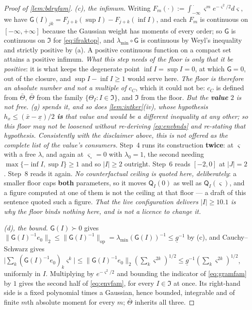 \begin{proof}[Proof of \cref{lem:bdryfam}]
\emph{(c), the infimum.} Writing $F_m(\cdot):=\int_{-\infty}^{\,\cdot}\varsigma^{m}e^{-\varsigma^{2}/2}
d\varsigma$, we have $\mathsf G(I)_{jk}=F_{j+k}(\sup I)-F_{j+k}(\inf I)$, and each $F_m$ is continuous
on $[-\infty,+\infty]$ because the Gaussian weight has moments of every order; so $\mathsf G$ is
continuous on $\mathfrak I$ for \eqref{eq:ifraktop}, and $\lambda_{\min}\circ\mathsf G$ is continuous by
Weyl's inequality and strictly positive by (a). A positive continuous function on a compact set attains
a positive infimum. \emph{What this step needs of the floor is only that it be positive}: it is what keeps the
degenerate point $\inf I=\sup I=0$, at which $\mathsf G=0$, out of the closure, and $\sup I-\inf I\ge1$
would serve here. \emph{The floor is therefore an absolute number and not a multiple of $c_C$}, which it
could not be: $c_C$ is defined from $\bar\Theta$, $\bar\Theta$ from the family
$\{\Theta_I:I\in\mathfrak I\}$, and $\mathfrak I$ from the floor.
\emph{But the \textbf{value} $2$ is not free. \textup{(g)} spends it, and so does
\cref{lem:intker}\textup{(iv)}, whose hypothesis $h_x\le(\bar x-\underline x)/2$ \textbf{is} that
value and would be a different inequality at any other; so this floor may not be loosened without
re-deriving \eqref{eq:envbnds} and re-stating that hypothesis. Consistently with the disclaimer
above, this is not offered as the complete list of the value's consumers.} Step~4 runs its construction \textbf{twice}: at
$\varsigma$ with a free $\lambda$, and again at $\varsigma_\circ=0$ with $\lambda_0=1$, the second needing
$\max\{-\inf I,\sup I\}\ge1$ and so $|I|\ge2$ outright. Step~6 reads $[-2,0]$ at $|J|=2$. Step~8 reads it
again. \emph{No counterfactual ceiling is quoted here, deliberately}: a smaller floor caps
\textbf{both} parameters, so it moves $\mathsf Q_I(0)$ as well as $\mathsf Q_I(\varsigma)$, and a figure
computed at one of them is not the ceiling at that floor --- a draft of this sentence quoted such a
figure. \emph{That the live configuration delivers $|I|\ge10.1$ is why the floor binds nothing here, and
is not a licence to change it.}

\emph{(d), the bound.} $\mathsf G(I)\succ0$ gives
$\|\mathsf G(I)^{-1}e_0\|_2\le\|\mathsf G(I)^{-1}\|_{\mathrm{op}}=\lambda_{\min}(\mathsf G(I))^{-1}\le\underline g^{-1}$
by (c), and Cauchy--Schwarz gives
$\big|\sum_k(\mathsf G(I)^{-1}e_0)_k\varsigma^{k}\big|\le\|\mathsf G(I)^{-1}e_0\|_2(\sum_k\varsigma^{2k})^{1/2}
\le\underline g^{-1}(\sum_k\varsigma^{2k})^{1/2}$, uniformly in $I$. Multiplying by $e^{-\varsigma^{2}/2}$
and bounding the indicator of \eqref{eq:gramfam} by $1$ gives the second half of \eqref{eq:envfam}, for
every $I\in\mathfrak I$ at once. Its right-hand side is a fixed polynomial times a Gaussian, hence
bounded, integrable and of finite $m$th absolute moment for every $m$; $\bar\Theta$ inherits all three.


\end{proof}
